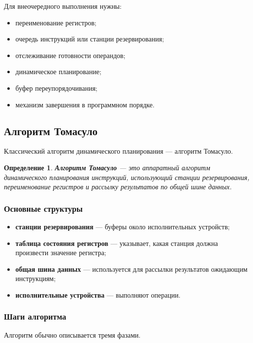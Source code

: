 \documentclass[12pt,a4paper]{article}
\newtheorem{definition}{Определение}
\begin{document}
Для внеочередного выполнения нужны:

\begin{itemize}
    \item переименование регистров;
    \item очередь инструкций или станции резервирования;
    \item отслеживание готовности операндов;
    \item динамическое планирование;
    \item буфер переупорядочивания;
    \item механизм завершения в программном порядке.
\end{itemize}

\subsection{Алгоритм Томасуло}

Классический алгоритм динамического планирования --- алгоритм Томасуло.

\begin{definition}
\textbf{Алгоритм Томасуло} --- это аппаратный алгоритм динамического планирования инструкций, использующий станции резервирования, переименование регистров и рассылку результатов по общей шине данных.
\end{definition}

\subsubsection{Основные структуры}

\begin{itemize}
    \item \textbf{станции резервирования} --- буферы около исполнительных устройств;
    \item \textbf{таблица состояния регистров} --- указывает, какая станция должна произвести значение регистра;
    \item \textbf{общая шина данных} --- используется для рассылки результатов ожидающим инструкциям;
    \item \textbf{исполнительные устройства} --- выполняют операции.
\end{itemize}

\subsubsection{Шаги алгоритма}

Алгоритм обычно описывается тремя фазами.
\end{document}
